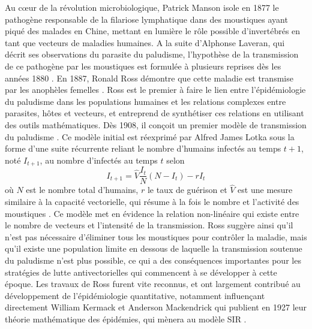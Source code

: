 Au c\oe ur de la révolution microbiologique, Patrick Manson isole en 1877 le pathogène responsable de la filariose lymphatique dans des moustiques ayant piqué des malades en Chine, mettant en lumière le rôle possible d'invertébrés en tant que vecteurs de maladies humaines. 
A la suite d'Alphonse Laveran, qui décrit ses observations du parasite du paludisme, l'hypothèse de la transmission de ce pathogène par les moustiques est formulée à plusieurs reprises dès les années 1880 \cite{ross1967researches}.
En 1887, Ronald Ross démontre que cette maladie est transmise par les anophèles femelles \cite{ross1897some}. 
Ross est le premier à faire le lien entre l'épidémiologie du paludisme dans les populations humaines et les relations complexes entre parasites, hôtes et vecteurs, et entreprend de synthétiser ces relations en utilisant des outils mathématiques.
Dès 1908, il conçoit un premier modèle de transmission du paludisme \cite{ross1908report}.
Ce modèle initial est réexprimé par Alfred James Lotka sous la forme d'une suite récurrente reliant le nombre d'humains infectés au temps $t+1$, noté $I_{t+1}$, au nombre d'infectés au temps $t$ selon
\begin{equation}
I_{t+1} = \hat{V}\frac{I_t}{N}(N-I_t)-rI_t
\end{equation}
où $N$ est le nombre total d'humains, $r$ le taux de guérison et $\hat{V}$ est une mesure similaire à la capacité vectorielle, qui résume à la fois le nombre et l'activité des moustiques \cite{lotka1923contribution}. 
Ce modèle met en évidence la relation non-linéaire qui existe entre le nombre de vecteurs et l'intensité de la transmission. 
Ross suggère ainsi qu'il n'est pas nécessaire d'éliminer tous les moustiques pour contrôler la maladie, mais qu'il existe une population limite en dessous de laquelle la transmission soutenue du paludisme n'est plus possible, ce qui a des conséquences importantes pour les stratégies de lutte antivectorielles qui commencent à se développer à cette époque.
Les travaux de Ross furent vite reconnus, et ont largement contribué au développement de l'épidémiologie quantitative, notamment influençant directement William Kermack et Anderson Mackendrick qui publient en 1927 leur théorie mathématique des épidémies, qui mènera au modèle SIR \cite{kermack1927contributions}.

